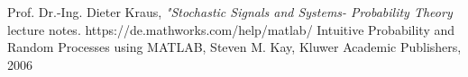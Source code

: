 \begin{thebibliography}{15}
 Prof. Dr.-Ing. Dieter Kraus,\textit{ "Stochastic Signals and Systems- Probability Theory} lecture notes.
 https://de.mathworks.com/help/matlab/
 Intuitive Probability and Random Processes using MATLAB, Steven M. Kay, Kluwer Academic Publishers, 2006


\end{thebibliography}
